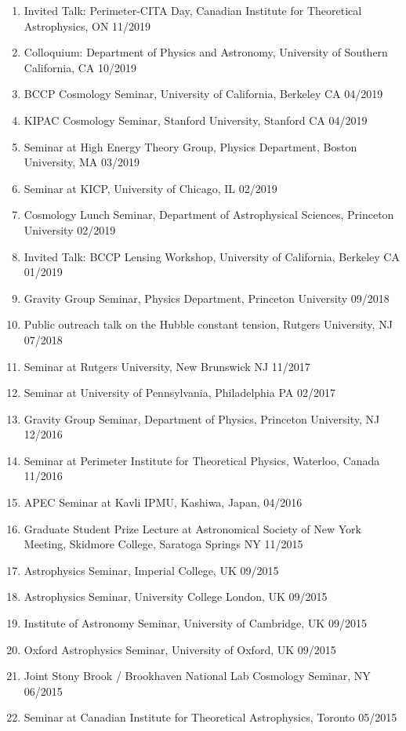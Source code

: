 \begin{enumerate}
  \item Invited Talk: Perimeter-CITA Day, Canadian Institute for
    Theoretical Astrophysics, ON 11/2019
  \item Colloquium: Department of Physics and Astronomy, University of
    Southern California, CA 10/2019
  \item BCCP Cosmology Seminar, University of California, Berkeley CA 04/2019
  \item KIPAC Cosmology Seminar, Stanford University, Stanford CA 04/2019
  \item Seminar at High Energy Theory Group, Physics Department, Boston
    University, MA 03/2019
  \item Seminar at KICP, University of Chicago, IL 02/2019
  \item Cosmology Lunch Seminar, Department of Astrophysical Sciences,
      Princeton University 02/2019
  \item Invited Talk: BCCP Lensing Workshop, University of California, Berkeley CA 01/2019
  \item Gravity Group Seminar, Physics Department, Princeton University 09/2018
  \item Public outreach talk on the Hubble constant tension, Rutgers University, NJ 07/2018
  \item Seminar at Rutgers University, New Brunswick NJ 11/2017
  \item Seminar at University of Pennsylvania, Philadelphia PA 02/2017
  \item Gravity Group Seminar, Department of Physics, Princeton University, NJ 12/2016
  \item Seminar at Perimeter Institute for Theoretical Physics, Waterloo, Canada 11/2016
  \item APEC Seminar at Kavli IPMU, Kashiwa, Japan, 04/2016
  \item Graduate Student Prize Lecture at Astronomical Society of New York Meeting, Skidmore College, Saratoga Springs NY 11/2015
  \item Astrophysics Seminar, Imperial College, UK 09/2015
  \item Astrophysics Seminar, University College London, UK 09/2015
  \item Institute of Astronomy Seminar, University of Cambridge, UK 09/2015
  \item Oxford Astrophysics Seminar, University of Oxford, UK 09/2015
  \item Joint Stony Brook / Brookhaven National Lab Cosmology Seminar, NY 06/2015
  \item Seminar at Canadian Institute for Theoretical Astrophysics, Toronto 05/2015

\end{enumerate}
